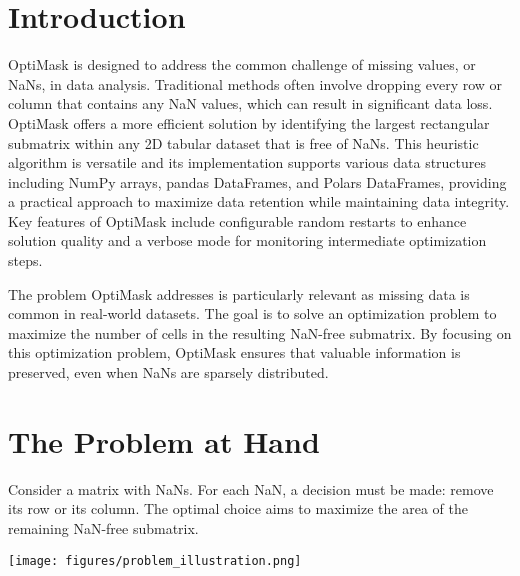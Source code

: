 \documentclass[a0,landscape]{a0poster}
\begin{document}
\begin{multicols}{4} %

	\color{Navy} %

	\section*{Introduction}

	OptiMask is designed to address the common challenge of missing values, or NaNs, in data analysis. Traditional methods often involve dropping every row or column that contains any NaN values, which can result in significant data loss. OptiMask offers a more efficient solution by identifying the largest rectangular submatrix within any 2D tabular dataset that is free of NaNs. This heuristic algorithm is versatile and its implementation supports various data structures including NumPy arrays, pandas DataFrames, and Polars DataFrames, providing a practical approach to maximize data retention while maintaining data integrity. Key features of OptiMask include configurable random restarts to enhance solution quality and a verbose mode for monitoring intermediate optimization steps.

	The problem OptiMask addresses is particularly relevant as missing data is common in real-world datasets. The goal is to solve an optimization problem to maximize the number of cells in the resulting NaN-free submatrix. By focusing on this optimization problem, OptiMask ensures that valuable information is preserved, even when NaNs are sparsely distributed.

	\section*{The Problem at Hand}

	Consider a matrix with NaNs. For each NaN, a decision must be made: remove its row or its column. The optimal choice aims to maximize the area of the remaining NaN-free submatrix.

	\begin{center}\vspace{0.5cm}
		\texttt{[image: figures/problem\_illustration.png]} %
		\label{fig:problem_illustration}
	\end{center}\vspace{0.5cm}


\end{multicols}
\end{document}
